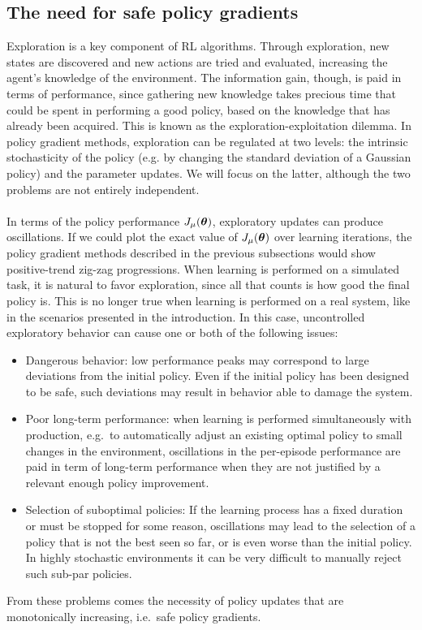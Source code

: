\subsection{The need for safe policy gradients}
Exploration is a key component of \ac{RL} algorithms. Through exploration, new states are discovered and new actions are tried and evaluated, increasing the agent's knowledge of the environment. The information gain, though, is paid in terms of performance, since gathering new knowledge takes precious time that could be spent in performing a good policy, based on the knowledge that has already been acquired. This is known as the exploration-exploitation dilemma. In policy gradient methods, exploration can be regulated at two levels: the intrinsic stochasticity of the policy (e.g. by changing the standard deviation of a Gaussian policy) and the parameter updates. We will focus on the latter, although the two problems are not entirely independent. 
\paragraph{}In terms of the policy performance $J_\mu(\boldsymbol{\theta})$, exploratory updates can produce oscillations. If we could plot the exact value of $J_\mu(\boldsymbol{\theta})$ over learning iterations, the policy gradient methods described in the previous subsections would show positive-trend zig-zag progressions. When learning is performed on a simulated task, it is natural to favor exploration, since all that counts is how good the final policy is. This is no longer true when learning is performed on a real system, like in the scenarios presented in the introduction. In this case, uncontrolled exploratory behavior can cause one or both of the following issues:
\begin{itemize}
\item Dangerous behavior: low performance peaks may correspond to large deviations from the initial policy. Even if the initial policy has been designed to be safe, such deviations may result in behavior able to damage the system.
\item Poor long-term performance: when learning is performed simultaneously with production, e.g.\ to automatically adjust an existing optimal policy to small changes in the environment, oscillations in the per-episode performance are paid in term of long-term performance when they are not justified by a relevant enough policy improvement.
\item Selection of suboptimal policies: If the learning process has a fixed duration or must be stopped for some reason, oscillations may lead to the selection of a policy that is not the best seen so far, or is even worse than the initial policy. In highly stochastic environments it can be very difficult to manually reject such sub-par policies.
\end{itemize} 
From these problems comes the necessity of policy updates that are monotonically increasing, i.e.\ safe policy gradients.

